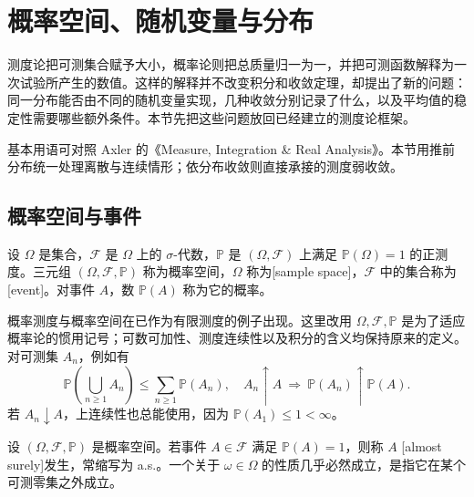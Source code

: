 \section{概率空间、随机变量与分布}
\label{b1:sec:3001}

测度论把可测集合赋予大小，概率论则把总质量归一为一，并把可测函数解释为一次试验所产生的数值。这样的解释并不改变积分和收敛定理，却提出了新的问题：同一分布能否由不同的随机变量实现，几种收敛分别记录了什么，以及平均值的稳定性需要哪些额外条件。本节先把这些问题放回已经建立的测度论框架。

\ProseParagraphBreak

基本用语可对照 Axler 的《Measure, Integration \& Real Analysis》\cite[Definition 12.1, Definition 12.13, Definition 12.18, Definition 12.27, pp.~381, 385, 388, 392]{Axler2020Measure}。本节用推前分布统一处理离散与连续情形；依分布收敛则直接承接的测度弱收敛。

\subsection{概率空间与事件}
\label{b1:subsec:300101}

\begin{definition}\label{b1:def:30-probability-space}
设 \(\Omega\) 是集合，\(\mathcal F\) 是 \(\Omega\) 上的 \(\sigma\)-代数，\(\mathbb P\) 是 \((\Omega,\mathcal F)\) 上满足 \(\mathbb P(\Omega)=1\) 的正测度。三元组 \((\Omega,\mathcal F,\mathbb P)\) 称为概率空间，\(\Omega\) 称为[sample space]，\(\mathcal F\) 中的集合称为[event]。对事件 \(A\)，数 \(\mathbb P(A)\) 称为它的概率。
\end{definition}

概率测度与概率空间在已作为有限测度的例子出现。这里改用 \(\Omega,\mathcal F,\mathbb P\) 是为了适应概率论的惯用记号；可数可加性、测度连续性以及积分的含义均保持原来的定义。对可测集 \(A_n\)，例如有
\[
 \mathbb P\left(\bigcup_{n\geq1}A_n\right)
 \leq\sum_{n\geq1}\mathbb P(A_n),
 \quad
 A_n\uparrow A\ \Longrightarrow\ \mathbb P(A_n)\uparrow\mathbb P(A).
\]
若 \(A_n\downarrow A\)，上连续性也总能使用，因为 \(\mathbb P(A_1)\leq1<\infty\)。

\begin{definition}\label{b1:def:30-almost-surely}
设 \((\Omega,\mathcal F,\mathbb P)\) 是概率空间。若事件 \(A\in\mathcal F\) 满足 \(\mathbb P(A)=1\)，则称 \(A\) [almost surely]发生，常缩写为 a.s.。一个关于 \(\omega\in\Omega\) 的性质几乎必然成立，是指它在某个可测零集之外成立。
\end{definition}

